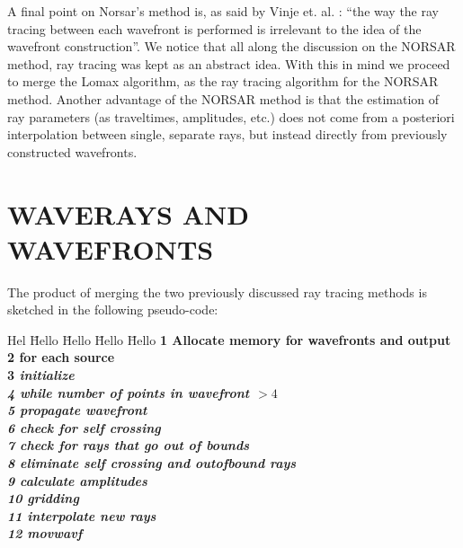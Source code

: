 A final point on Norsar's method is, as said by Vinje et. al.
:
``the way the ray tracing between each wavefront is performed
is irrelevant to the idea of the wavefront construction''.
We notice that all along the discussion on the NORSAR method,
ray tracing was kept as an abstract idea. With this in mind
we proceed to merge the Lomax algorithm, as the ray tracing 
algorithm for the NORSAR method. Another advantage of the
NORSAR method is that the estimation of ray parameters (as
traveltimes, amplitudes, etc.) does not come from a 
posteriori interpolation between single, separate rays,
but instead directly from previously constructed wavefronts.




\section{WAVERAYS AND WAVEFRONTS}

The product of merging the two previously discussed ray tracing methods
is sketched in the following pseudo-code:

\begin{tabbing}
Hel \= Hello \= Hello \= Hello \= Hello \kill
\bf 1 \> Allocate memory for wavefronts and output \\
\bf 2 \> for each source \\
\bf 3 \> \> \em initialize  \\
\bf 4 \> \> while number of points in wavefront $> 4$ \\
\bf 5 \> \> \> \em propagate wavefront \\
\bf 6 \> \> \> \em check for self crossing \\
\bf 7 \> \> \> \em check for rays that go out of bounds \\
\bf 8 \> \> \> \em eliminate self crossing and outofbound rays \\
\bf 9 \> \> \> \em calculate amplitudes \\
\bf 10 \> \> \> \em gridding \\
\bf 11 \> \> \> \em interpolate new rays \\
\bf 12 \> \> \> \em movwavf
\end{tabbing}

